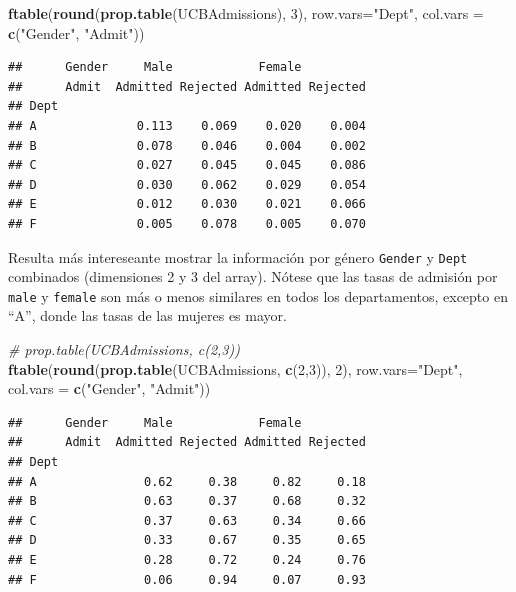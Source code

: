 \documentclass[]{book}
\newenvironment{Shaded}{\begin{snugshade}}{\end{snugshade}}
\newcommand{\KeywordTok}[1]{\textcolor[rgb]{0.13,0.29,0.53}{\textbf{#1}}}
\newcommand{\DataTypeTok}[1]{\textcolor[rgb]{0.13,0.29,0.53}{#1}}
\newcommand{\DecValTok}[1]{\textcolor[rgb]{0.00,0.00,0.81}{#1}}
\newcommand{\StringTok}[1]{\textcolor[rgb]{0.31,0.60,0.02}{#1}}
\newcommand{\CommentTok}[1]{\textcolor[rgb]{0.56,0.35,0.01}{\textit{#1}}}
\newcommand{\NormalTok}[1]{#1}
\begin{document}
\begin{Shaded}
\begin{Highlighting}[]
\KeywordTok{ftable}\NormalTok{(}\KeywordTok{round}\NormalTok{(}\KeywordTok{prop.table}\NormalTok{(UCBAdmissions), }\DecValTok{3}\NormalTok{),}
       \DataTypeTok{row.vars=}\StringTok{"Dept"}\NormalTok{, }\DataTypeTok{col.vars =} \KeywordTok{c}\NormalTok{(}\StringTok{"Gender"}\NormalTok{, }\StringTok{"Admit"}\NormalTok{))}
\end{Highlighting}
\end{Shaded}

\begin{verbatim}
##      Gender     Male            Female         
##      Admit  Admitted Rejected Admitted Rejected
## Dept                                           
## A              0.113    0.069    0.020    0.004
## B              0.078    0.046    0.004    0.002
## C              0.027    0.045    0.045    0.086
## D              0.030    0.062    0.029    0.054
## E              0.012    0.030    0.021    0.066
## F              0.005    0.078    0.005    0.070
\end{verbatim}

Resulta más intereseante mostrar la información por género
\texttt{Gender} y \texttt{Dept} combinados (dimensiones 2 y 3 del
array). Nótese que las tasas de admisión por \texttt{male} y
\texttt{female} son más o menos similares en todos los departamentos,
excepto en ``A'', donde las tasas de las mujeres es mayor.

\begin{Shaded}
\begin{Highlighting}[]
\CommentTok{# prop.table(UCBAdmissions, c(2,3))}
\KeywordTok{ftable}\NormalTok{(}\KeywordTok{round}\NormalTok{(}\KeywordTok{prop.table}\NormalTok{(UCBAdmissions, }\KeywordTok{c}\NormalTok{(}\DecValTok{2}\NormalTok{,}\DecValTok{3}\NormalTok{)), }\DecValTok{2}\NormalTok{),}
       \DataTypeTok{row.vars=}\StringTok{"Dept"}\NormalTok{, }\DataTypeTok{col.vars =} \KeywordTok{c}\NormalTok{(}\StringTok{"Gender"}\NormalTok{, }\StringTok{"Admit"}\NormalTok{))}
\end{Highlighting}
\end{Shaded}

\begin{verbatim}
##      Gender     Male            Female         
##      Admit  Admitted Rejected Admitted Rejected
## Dept                                           
## A               0.62     0.38     0.82     0.18
## B               0.63     0.37     0.68     0.32
## C               0.37     0.63     0.34     0.66
## D               0.33     0.67     0.35     0.65
## E               0.28     0.72     0.24     0.76
## F               0.06     0.94     0.07     0.93
\end{verbatim}
\end{document}
